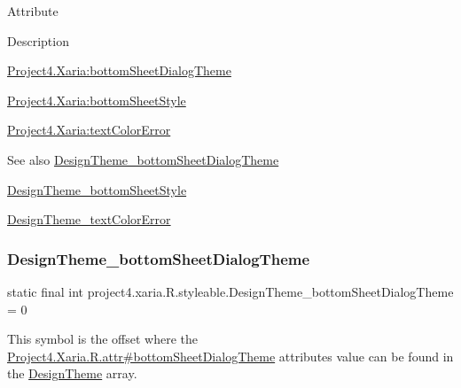 Attribute

Description 

{\ttfamily \hyperlink{classproject4_1_1xaria_1_1R_1_1styleable_aba996d6e1ec660c5b7390497dc2c2359}{Project4.\+Xaria\+:bottom\+Sheet\+Dialog\+Theme}}

{\ttfamily \hyperlink{classproject4_1_1xaria_1_1R_1_1styleable_abc176fafc34aad2467941c85f699cb37}{Project4.\+Xaria\+:bottom\+Sheet\+Style}}

{\ttfamily \hyperlink{classproject4_1_1xaria_1_1R_1_1styleable_ae4d0323b8c38346ddb8722e9bf22d47f}{Project4.\+Xaria\+:text\+Color\+Error}}

\begin{DoxySeeAlso}{See also}
\hyperlink{classproject4_1_1xaria_1_1R_1_1styleable_aba996d6e1ec660c5b7390497dc2c2359}{Design\+Theme\+\_\+bottom\+Sheet\+Dialog\+Theme} 

\hyperlink{classproject4_1_1xaria_1_1R_1_1styleable_abc176fafc34aad2467941c85f699cb37}{Design\+Theme\+\_\+bottom\+Sheet\+Style} 

\hyperlink{classproject4_1_1xaria_1_1R_1_1styleable_ae4d0323b8c38346ddb8722e9bf22d47f}{Design\+Theme\+\_\+text\+Color\+Error} 
\end{DoxySeeAlso}
\mbox{\label{classproject4_1_1xaria_1_1R_1_1styleable_aba996d6e1ec660c5b7390497dc2c2359}} 
\subsubsection{\texorpdfstring{Design\+Theme\+\_\+bottom\+Sheet\+Dialog\+Theme}{DesignTheme\_bottomSheetDialogTheme}}
{\footnotesize\ttfamily static final int project4.\+xaria.\+R.\+styleable.\+Design\+Theme\+\_\+bottom\+Sheet\+Dialog\+Theme = 0\hspace{0.3cm}{\ttfamily [static]}}

This symbol is the offset where the \hyperlink{}{Project4.\+Xaria.\+R.\+attr\#bottom\+Sheet\+Dialog\+Theme} attribute\textquotesingle{}s value can be found in the \hyperlink{classproject4_1_1xaria_1_1R_1_1styleable_a190554b7e28f27d85d823a1301dd3cf5}{Design\+Theme} array.

